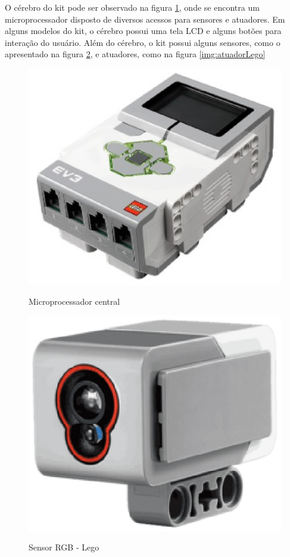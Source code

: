 O cérebro do kit pode ser observado na figura \ref{img:cerebro}, onde se encontra um microprocessador disposto de diversos acessos para sensores e atuadores. Em alguns modelos do kit, o cérebro possui uma tela LCD e alguns botões para interação do usuário. Além do cérebro, o kit possui alguns sensores, como o apresentado na figura \ref{img:sensorLego}, e atuadores, como na figura \ref{img:atuadorLego}

\begin{figure}[H]
	\centering
	\caption{Microprocessador central}
	\includegraphics[scale=0.6]{figuras/cerebro.eps}
	\label{img:cerebro}
\end{figure}	

\begin{figure}[H]
	\centering
	\caption{Sensor RGB - Lego}
	\includegraphics[scale=0.5]{figuras/sensorLego.eps}
	\label{img:sensorLego}
\end{figure}	


